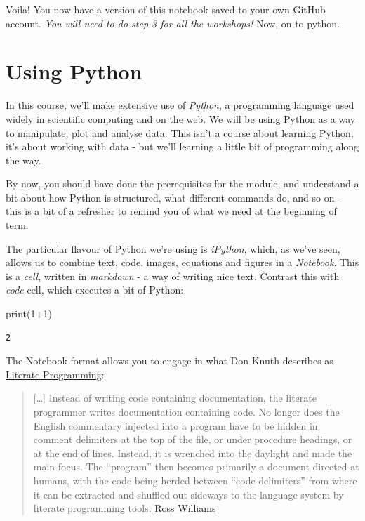 \documentclass[
  letterpaper,
  DIV=11,
  numbers=noendperiod]{scrreprt}
\newenvironment{Shaded}{\begin{snugshade}}{\end{snugshade}}
\newcommand{\BuiltInTok}[1]{\textcolor[rgb]{0.00,0.23,0.31}{#1}}
\newcommand{\DecValTok}[1]{\textcolor[rgb]{0.68,0.00,0.00}{#1}}
\newcommand{\NormalTok}[1]{\textcolor[rgb]{0.00,0.23,0.31}{#1}}
\newcommand{\OperatorTok}[1]{\textcolor[rgb]{0.37,0.37,0.37}{#1}}
\begin{document}
Voila! You now have a version of this notebook saved to your own GitHub
account. \emph{You will need to do step 3 for all the workshops!} Now,
on to python.

\hypertarget{using-python}{%
\section{Using Python}\label{using-python}}

In this course, we'll make extensive use of \emph{Python}, a programming
language used widely in scientific computing and on the web. We will be
using Python as a way to manipulate, plot and analyse data. This isn't a
course about learning Python, it's about working with data - but we'll
learning a little bit of programming along the way.

By now, you should have done the prerequisites for the module, and
understand a bit about how Python is structured, what different commands
do, and so on - this is a bit of a refresher to remind you of what we
need at the beginning of term.

The particular flavour of Python we're using is \emph{iPython}, which,
as we've seen, allows us to combine text, code, images, equations and
figures in a \emph{Notebook}. This is a \emph{cell}, written in
\emph{markdown} - a way of writing nice text. Contrast this with
\emph{code} cell, which executes a bit of Python:

\begin{Shaded}
\begin{Highlighting}[]
\BuiltInTok{print}\NormalTok{(}\DecValTok{1}\OperatorTok{+}\DecValTok{1}\NormalTok{)}
\end{Highlighting}
\end{Shaded}

\begin{verbatim}
2
\end{verbatim}

The Notebook format allows you to engage in what Don Knuth describes as
\href{http://en.wikipedia.org/wiki/Literate_programming}{Literate
Programming}:

\begin{quote}
{[}\ldots{]} Instead of writing code containing documentation, the
literate programmer writes documentation containing code. No longer does
the English commentary injected into a program have to be hidden in
comment delimiters at the top of the file, or under procedure headings,
or at the end of lines. Instead, it is wrenched into the daylight and
made the main focus. The ``program'' then becomes primarily a document
directed at humans, with the code being herded between ``code
delimiters'' from where it can be extracted and shuffled out sideways to
the language system by literate programming tools.
\href{http://www.literateprogramming.com/lpquotes.html}{Ross Williams}
\end{quote}
\end{document}
